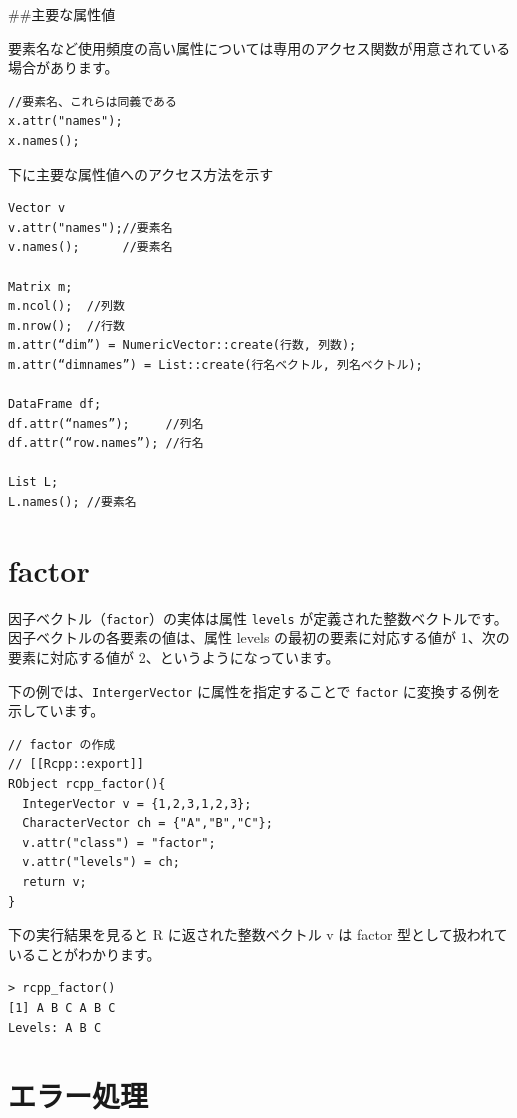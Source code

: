 \documentclass[]{book}
\begin{document}
\#\#主要な属性値

要素名など使用頻度の高い属性については専用のアクセス関数が用意されている場合があります。

\begin{verbatim}
//要素名、これらは同義である
x.attr("names");
x.names();
\end{verbatim}

下に主要な属性値へのアクセス方法を示す

\begin{verbatim}
Vector v
v.attr("names");//要素名
v.names();      //要素名

Matrix m;
m.ncol();  //列数
m.nrow();  //行数
m.attr(“dim”) = NumericVector::create(行数, 列数);
m.attr(“dimnames”) = List::create(行名ベクトル, 列名ベクトル);

DataFrame df;
df.attr(“names”);     //列名
df.attr(“row.names”); //行名

List L;
L.names(); //要素名
\end{verbatim}

\hypertarget{factor}{%
\chapter{factor}\label{factor}}

因子ベクトル（\texttt{factor}）の実体は属性 \texttt{levels} が定義された整数ベクトルです。因子ベクトルの各要素の値は、属性 levels の最初の要素に対応する値が 1、次の要素に対応する値が 2、というようになっています。

下の例では、\texttt{IntergerVector} に属性を指定することで \texttt{factor} に変換する例を示しています。

\begin{verbatim}
// factor の作成
// [[Rcpp::export]]
RObject rcpp_factor(){
  IntegerVector v = {1,2,3,1,2,3};
  CharacterVector ch = {"A","B","C"};
  v.attr("class") = "factor";
  v.attr("levels") = ch;
  return v;
}
\end{verbatim}

下の実行結果を見ると R に返された整数ベクトル v は factor 型として扱われていることがわかります。

\begin{verbatim}
> rcpp_factor()
[1] A B C A B C
Levels: A B C
\end{verbatim}

\chapter{エラー処理}
\end{document}
